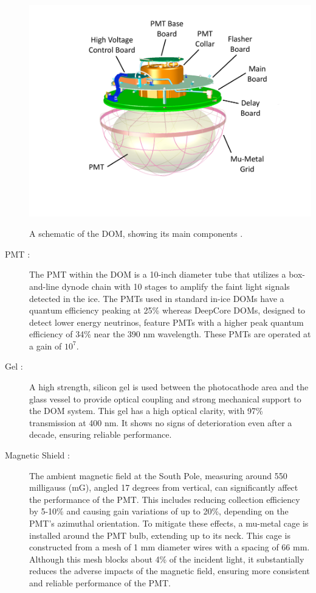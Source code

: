 \begin{description}
    \begin{marginfigure}
        \includegraphics{./figures/nu_in_icecube/domfig1a-DOM3DModel.pdf}
        \caption[A schematic of the DOM]{A schematic of the DOM, showing its main components \cite{Aartsen_2017}.}
    \end{marginfigure}

    \item[PMT :] The PMT within the DOM is a 10-inch diameter tube that utilizes a box-and-line dynode chain with 10 stages to amplify the faint light signals detected in the ice. The PMTs used in standard in-ice DOMs have a quantum efficiency peaking at 25\% whereas DeepCore DOMs, designed to detect lower energy neutrinos, feature PMTs with a higher peak quantum efficiency of 34\% near the 390 nm wavelength. These PMTs are operated at a gain of $10^7$.

    \item[Gel :] A high strength, silicon gel is used between the photocathode area and the glass vessel to provide optical coupling and strong mechanical support to the DOM system. This gel has a high optical clarity, with 97\% transmission at 400 nm. It shows no signs of deterioration even after a decade, ensuring reliable performance.

    \item[Magnetic Shield :] The ambient magnetic field at the South Pole, measuring around 550 milligauss (mG), angled 17 degrees from vertical, can significantly affect the performance of the PMT. This includes reducing collection efficiency by 5-10\% and causing gain variations of up to 20\%, depending on the PMT's azimuthal orientation. To mitigate these effects, a mu-metal cage is installed around the PMT bulb, extending up to its neck. This cage is constructed from a mesh of 1 mm diameter wires with a spacing of 66 mm. Although this mesh blocks about 4\% of the incident light, it substantially reduces the adverse impacts of the magnetic field, ensuring more consistent and reliable performance of the PMT.


\end{description}
